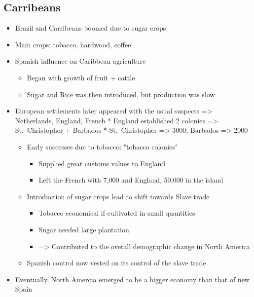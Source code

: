 \documentclass[letterpaper]{article}
\begin{document}
\subsection{Carribeans}
\label{sec:orgedff968}
\begin{itemize}
\item Brazil and Carribeans boomed due to sugar crops
\item Main crops: tobacco, hardwood, coffee
\item Spanish influence on Caribbean agriculture

\begin{itemize}
\item Began with growth of fruit + cattle
\item Sugar and Rice was then introduced, but production was slow
\end{itemize}

\item European settlements later appeared with the usual suspects =>
Netherlands, England, French * England established 2 colonies =>
St. Christopher + Barbados * St. Christopher => 3000, Barbados => 2000

\begin{itemize}
\item Early successes due to tobacco: "tobacco colonies"

\begin{itemize}
\item Supplied great customs values to England
\item Left the French with 7,000 and England, 50,000 in the island
\end{itemize}

\item Introduction of sugar crops lead to shift towards Slave trade

\begin{itemize}
\item Tobacco economical if cultivated in small quantities
\item Sugar needed large plantation
\item => Contributed to the overall demographic change in North America
\end{itemize}

\item Spanish control now vested on its control of the slave trade
\end{itemize}

\item Eventually, North Amercia emerged to be a bigger economy than that of
new Spain
\end{itemize}
\end{document}
